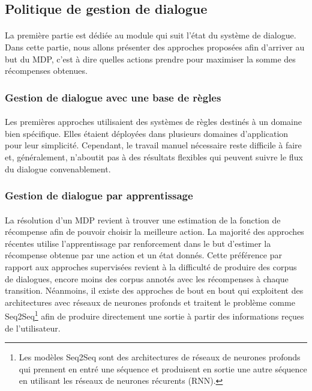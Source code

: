 	\subsection{Politique de gestion de dialogue}
		\paragraph{}
		La première partie est dédiée au module qui suit l’état du système de dialogue. Dans cette partie, nous allons présenter des approches proposées afin d’arriver au but du MDP, c’est à dire quelles actions prendre pour maximiser la somme des récompenses obtenues.
		\subsubsection{Gestion de dialogue avec une base de règles}
		\paragraph{}
		Les premières approches utilisaient des systèmes de règles destinés à un domaine bien spécifique. Elles étaient déployées dans plusieurs domaines d’application pour leur simplicité. Cependant, le travail manuel nécessaire reste difficile à faire et, généralement, n’aboutit pas à des résultats flexibles qui peuvent suivre le flux du dialogue convenablement\cite{Lee2010}.
	\subsubsection{Gestion de dialogue par apprentissage}
		\paragraph{}
		La résolution d’un MDP revient à trouver une estimation de la fonction de récompense afin de pouvoir choisir la meilleure action. La majorité des approches récentes utilise l’apprentissage par renforcement dans le but d’estimer la récompense obtenue par une action et un état donnés. Cette préférence par rapport aux approches supervisées revient à la difficulté de produire des corpus de dialogues\cite{Henderson2008}, encore moins des corpus annotés avec les récompenses à chaque transition. Néanmoins, il existe des approches de bout en bout qui exploitent des architectures avec réseaux de neurones profonds et traitent le problème comme Seq2Seq\footnote{Les modèles Seq2Seq sont des architectures de réseaux de neurones profonds qui prennent en entré une séquence et produisent en sortie une autre séquence en utilisant les réseaux de neurones récurents (RNN).} afin de produire directement une sortie à partir des informations reçues de l’utilisateur\cite{Wen2017,Serban2016}.


